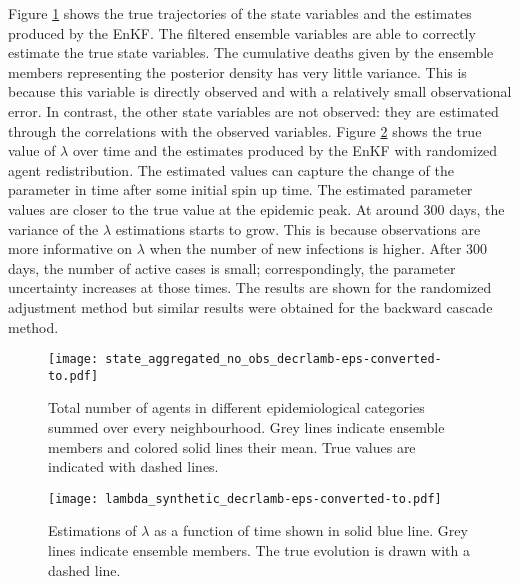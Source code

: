 \documentclass[11pt,a4paper]{article}
\begin{document}
Figure \ref{fig:moving_lambda_state_sum} shows the true trajectories of the state variables and the estimates produced by the EnKF. The filtered ensemble variables are able to correctly estimate the true state variables. The cumulative deaths given by the ensemble members representing the posterior density has very little variance. This is because this variable is directly observed and with a relatively small observational error. In contrast, the other state variables are not observed: they are estimated through the correlations with the observed variables. Figure \ref{fig:moving_lambda_estimates} shows the true value of $\lambda$ over time and the estimates produced by the EnKF with randomized agent redistribution. The estimated values can capture the change of the parameter in time after some initial spin up time. The estimated parameter values are closer to the true value at the epidemic peak. At around 300 days, the variance of the $\lambda$ estimations starts to grow. This is because observations are more informative on $\lambda$ when the number of new infections is higher. After 300 days, the number of active cases is small; correspondingly, the parameter uncertainty increases at those times. The results are shown for the randomized adjustment method but similar results were obtained for the backward cascade method.

\begin{figure}
    \captionsetup{width=0.5\textwidth}
    \centering
    \texttt{[image: state\_aggregated\_no\_obs\_decrlamb-eps-converted-to.pdf]}
    \caption{Total number of agents in different epidemiological categories summed over every neighbourhood. Grey lines indicate ensemble members and colored solid lines their mean. True values are indicated with dashed lines.}
    \label{fig:moving_lambda_state_sum}
\end{figure}

\begin{figure}
    \captionsetup{width=0.5\textwidth}
    \centering
    \texttt{[image: lambda\_synthetic\_decrlamb-eps-converted-to.pdf]}
    \caption{Estimations of $\lambda$ as a function of time shown in solid blue line. Grey lines indicate ensemble members. The true evolution is drawn with a dashed line.}
    \label{fig:moving_lambda_estimates}
\end{figure}
\end{document}

